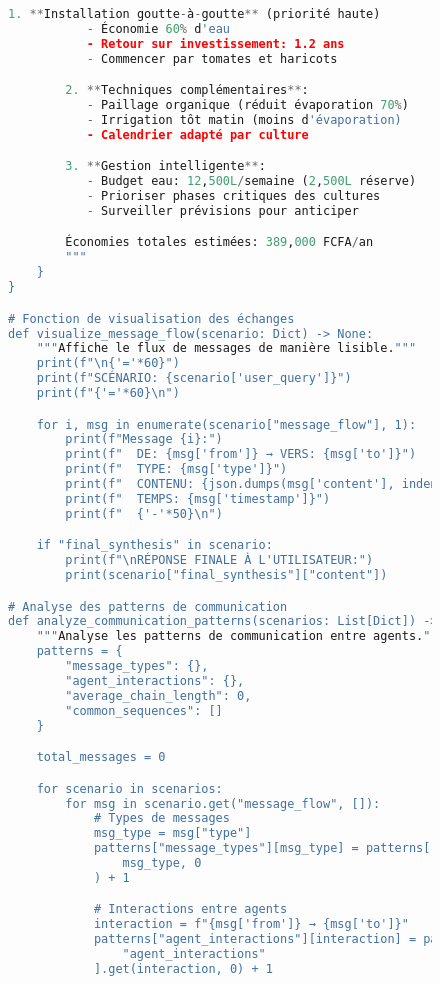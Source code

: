 \begin{figure}[h]
\begin{lstlisting}[language=Python, caption=Exemples de communications inter-agents en action]
        1. **Installation goutte-à-goutte** (priorité haute)
           - Économie 60% d'eau
           - Retour sur investissement: 1.2 ans
           - Commencer par tomates et haricots

        2. **Techniques complémentaires**:
           - Paillage organique (réduit évaporation 70%)
           - Irrigation tôt matin (moins d'évaporation)
           - Calendrier adapté par culture

        3. **Gestion intelligente**:
           - Budget eau: 12,500L/semaine (2,500L réserve)
           - Prioriser phases critiques des cultures
           - Surveiller prévisions pour anticiper

        Économies totales estimées: 389,000 FCFA/an
        """
    }
}

# Fonction de visualisation des échanges
def visualize_message_flow(scenario: Dict) -> None:
    """Affiche le flux de messages de manière lisible."""
    print(f"\n{'='*60}")
    print(f"SCÉNARIO: {scenario['user_query']}")
    print(f"{'='*60}\n")

    for i, msg in enumerate(scenario["message_flow"], 1):
        print(f"Message {i}:")
        print(f"  DE: {msg['from']} → VERS: {msg['to']}")
        print(f"  TYPE: {msg['type']}")
        print(f"  CONTENU: {json.dumps(msg['content'], indent=4, ensure_ascii=False)}")
        print(f"  TEMPS: {msg['timestamp']}")
        print(f"  {'-'*50}\n")

    if "final_synthesis" in scenario:
        print(f"\nRÉPONSE FINALE À L'UTILISATEUR:")
        print(scenario["final_synthesis"]["content"])

# Analyse des patterns de communication
def analyze_communication_patterns(scenarios: List[Dict]) -> Dict:
    """Analyse les patterns de communication entre agents."""
    patterns = {
        "message_types": {},
        "agent_interactions": {},
        "average_chain_length": 0,
        "common_sequences": []
    }

    total_messages = 0

    for scenario in scenarios:
        for msg in scenario.get("message_flow", []):
            # Types de messages
            msg_type = msg["type"]
            patterns["message_types"][msg_type] = patterns["message_types"].get(
                msg_type, 0
            ) + 1

            # Interactions entre agents
            interaction = f"{msg['from']} → {msg['to']}"
            patterns["agent_interactions"][interaction] = patterns[
                "agent_interactions"
            ].get(interaction, 0) + 1


\end{lstlisting}
\end{figure}
